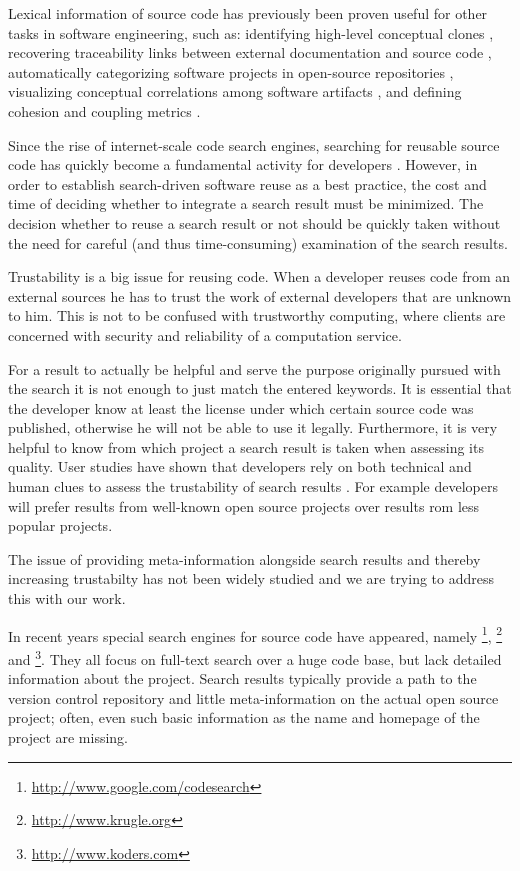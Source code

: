 Lexical information of source code has previously been proven useful for other tasks in software engineering, such as: identifying high-level conceptual clones \cite{Marc01a}, recovering traceability links between external documentation and source code \cite{Anto02a}, automatically categorizing software projects in open-source repositories \cite{Kawa04a}, visualizing conceptual correlations among software artifacts \cite{Kuhn07a,Kuhn08b}, and defining cohesion and coupling metrics \cite{Marc05a,Posh09a}.

Since the rise of internet-scale code search engines, searching for reusable source code has quickly become a fundamental activity for developers \cite{Kuhn09b}. However, in order to establish search-driven software reuse as a best practice, the cost and time of deciding whether to integrate a search result must be minimized. The decision whether to reuse a search result or not should be quickly taken without the need for careful (and thus time-consuming) examination of the search results.

Trustability is a big issue for reusing code. When a developer reuses code from an external sources he has to trust the work of external developers that are unknown to him. This is not to be confused with trustworthy computing, where clients are concerned with security and reliability of a computation service.

For a result to actually be helpful and serve the purpose originally pursued with the search it is not enough to just match the entered keywords.
It is essential that the developer know at least the license under which certain source code was published, otherwise he will not be able to use it legally. Furthermore, it is very helpful to know from which project a search result is taken when assessing its quality.
User studies have shown that developers rely on both technical and human clues to assess the trustability of search results \cite{Gall09a}. For example developers will prefer results from well-known open source projects over results rom less popular projects.

The issue of providing meta-information alongside search results and thereby increasing trustabilty has not been widely studied and we are trying to address this with our work.

In recent years special search engines for source code have appeared, namely  \textsc{\gcs}\footnote{\url{http://www.google.com/codesearch}}, \textsc{\krugle}\footnote{\url{http://www.krugle.org}} and  \textsc{\koders}\footnote{\url{http://www.koders.com}}. They all focus on full-text search over a huge code base, but lack detailed information about the project. Search results typically provide a path to the version control repository and little meta-information on the actual open source project; often, even such basic information as the name and homepage of the project are missing.


